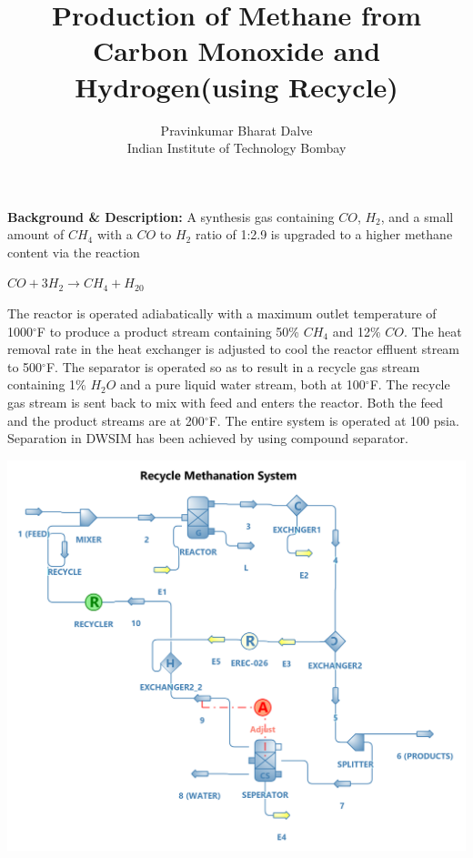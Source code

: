 \documentclass[a4paper,12pt]{article}
\title{Production of Methane from Carbon Monoxide and Hydrogen(using Recycle)}
\author{Pravinkumar Bharat Dalve \\ Indian Institute of Technology Bombay}
\date{}
\begin{document}
\maketitle

\noindent \textbf{Background \& Description:}
\newline A synthesis gas containing $CO$, $H_2$, and a small amount of $CH_4$ with a $CO$ to $H_2$ ratio of 1:2.9 is upgraded to a higher methane content via the reaction

\begin{center}
 $CO + 3H_2 \rightarrow CH_4 + H_20$
\end{center}

The reactor is operated adiabatically with a maximum outlet temperature of 1000$^\circ$F to produce a product stream containing 50\% $CH_4$ and 12\% $CO$. The heat removal rate in the heat exchanger is adjusted to cool the reactor effluent stream to 500$^\circ$F. The separator is operated so as to result in a recycle gas stream containing 1\% $H_2O$ and a pure liquid water stream, both at 100$^\circ$F. The recycle gas stream is sent back to mix with feed and enters the reactor. Both the feed and the product streams are at 200$^\circ$F. The entire system is operated at 100 psia. Separation in DWSIM has been achieved by using compound separator.

\centerline{\includegraphics[width=0.9\linewidth]{Meth-Recycle.png}}
\end{document}
